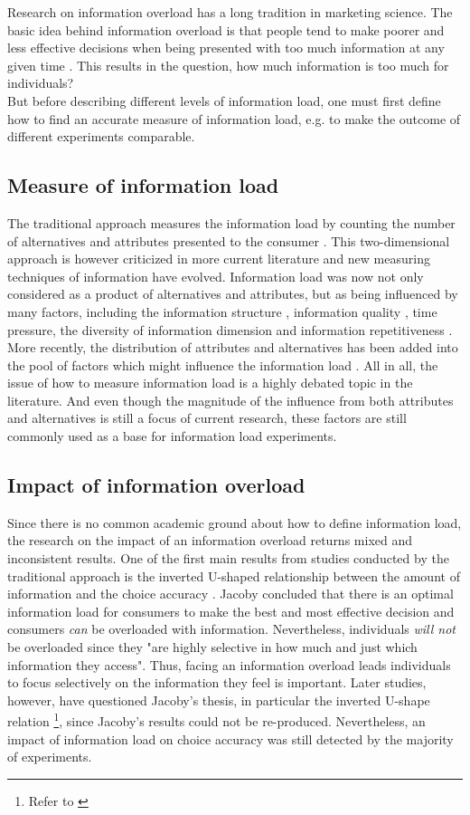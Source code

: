 Research on information overload has a long tradition in marketing science.
The basic idea behind information overload is that people tend to make poorer and less effective decisions when being presented with too much information at any given time \citep{Siegfried1965}. 
This results in the question, how much information is too much for individuals?\\
But before describing different levels of information load, one must first define how to find an accurate measure of information load, e.g. to make the outcome of different experiments comparable.
\subsection{Measure of information load}
The traditional approach measures the information load by counting the number of alternatives and attributes presented to the consumer \citep{Chen2009}. This two-dimensional approach is however criticized in more current literature and new measuring techniques of information have evolved. Information load was now not only considered as a product of alternatives and attributes, but as being influenced by many factors, including the information structure \citep{Lurie2004}, information quality \citep{Keller1987}, time pressure, the diversity of information dimension \citep{Payne1982} and information repetitiveness \citep{Hwang1999}.
More recently, the distribution of attributes and alternatives has been added into the pool of factors which might influence the information load \citep{Lurie2004}. 
All in all, the issue of how to measure information load is a highly debated topic in the literature. And even though the magnitude of the influence from both attributes and alternatives is still a focus of current research, these factors are still commonly used as a base for information load experiments.

\subsection{Impact of information overload}

Since there is no common academic ground about how to define information load, the research on the impact of an information overload returns mixed and inconsistent results.
One of the first main results from studies conducted by the traditional approach is the inverted U-shaped relationship between the amount of information and the choice accuracy \citep{Jacoby1974}. Jacoby concluded that there is an optimal information load for consumers to make the best and most effective decision and consumers \textit{can} be overloaded with information. Nevertheless, individuals \textit{will not} be overloaded since they "are highly selective in how much and just which information they access". Thus, facing an information overload leads individuals to focus selectively on the information they feel is important.
Later studies, however, have questioned Jacoby's thesis, in particular the inverted U-shape relation \footnote{Refer to \cite{Malhotra1982}}, since Jacoby's results could not be re-produced. Nevertheless, an impact of information load on choice accuracy was still detected by the majority of experiments.

